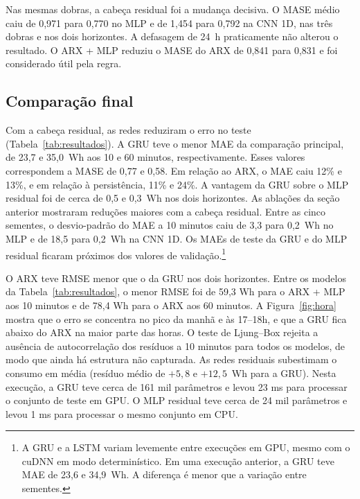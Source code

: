 \documentclass[11pt,a4paper]{article}
\begin{document}
Nas mesmas dobras, a cabeça residual foi a mudança decisiva. O MASE médio caiu de 0,971 para 0,770 no MLP e de 1,454 para 0,792 na CNN 1D, nas três dobras e nos dois horizontes. A defasagem de 24~h praticamente não alterou o resultado. O ARX + MLP reduziu o MASE do ARX de 0,841 para 0,831 e foi considerado útil pela regra.

\begin{table}[!htbp]
  \centering\small
  \setlength{\tabcolsep}{5pt}
  \renewcommand{\arraystretch}{1.12}
  \caption{MASE médio nas três dobras da validação com janelas expansivas (menor é melhor). Em negrito, as alternativas escolhidas pelas regras fixadas antes de rodar as dobras.}
  \label{tab:dobras}
  
\end{table}

\subsection{Comparação final}

Com a cabeça residual, as redes reduziram o erro no teste
(Tabela~\ref{tab:resultados}). A GRU teve o menor MAE da comparação
principal, de 23,7 e 35,0~Wh aos 10 e 60 minutos, respectivamente.
Esses valores correspondem a MASE de 0,77 e 0,58. Em relação ao ARX, o MAE caiu 12\% e 13\%, e em relação à persistência, 11\% e 24\%. A vantagem da GRU sobre o MLP residual foi de cerca de 0,5 e 0,3~Wh nos dois horizontes. As ablações da seção anterior mostraram reduções maiores com a cabeça residual. Entre as cinco sementes, o desvio-padrão do MAE a 10 minutos caiu de 3,3 para 0,2~Wh no MLP e de 18,5 para 0,2~Wh na CNN 1D. Os MAEs de teste da GRU e do MLP residual ficaram próximos dos valores de validação.\footnote{A GRU e a LSTM variam levemente entre execuções em GPU, mesmo com o cuDNN em modo determinístico. Em uma execução anterior, a GRU teve MAE de 23,6 e 34,9~Wh. A diferença é menor que a variação entre sementes.}

O ARX teve RMSE menor que o da GRU nos dois horizontes. Entre os modelos da Tabela~\ref{tab:resultados}, o menor RMSE foi de 59,3 Wh para o ARX + MLP aos 10 minutos e de 78,4 Wh para o ARX aos 60 minutos. A Figura~\ref{fig:hora} mostra que o erro se concentra no pico da manhã e às 17--18h, e que a GRU fica abaixo do ARX na maior parte das horas. O teste de Ljung--Box rejeita a ausência de autocorrelação dos resíduos a 10 minutos para todos os modelos, de modo que ainda há estrutura não capturada. As redes residuais subestimam o consumo em média (resíduo médio de $+5{,}8$ e $+12{,}5$~Wh para a GRU). Nesta execução, a GRU teve cerca de 161 mil parâmetros e levou 23 ms para processar o conjunto de teste em GPU. O MLP residual teve cerca de 24 mil parâmetros e levou 1 ms para processar o mesmo conjunto em CPU.
\end{document}
